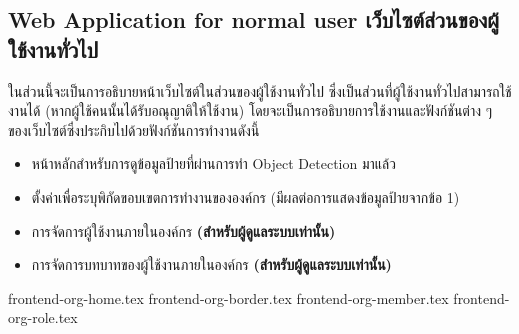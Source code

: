 \clearpage
\subsection{\ifenglish Web Application for normal user \else เว็บไซต์ส่วนของผู้ใช้งานทั่วไป \fi}
\ifenglish \else
ในส่วนนี้จะเป็นการอธิบายหน้าเว็บไซต์ในส่วนของผู้ใช้งานทั่วไป ซึ่งเป็นส่วนที่ผู้ใช้งานทั่วไปสามารถใช้งานได้ (หากผู้ใช้คนนั้นได้รับอณุญาติให้ใช้งาน) โดยจะเป็นการอธิบายการใช้งานและฟังก์ชันต่าง ๆ ของเว็บไซต์ซึ่งประกิบไปด้วยฟังก์ชันการทำงานดังนี้
\begin{itemize}
    \item หน้าหลักสำหรับการดูข้อมูลป้ายที่ผ่านการทำ Object Detection มาแล้ว
    \item ตั้งค่าเพื่อระบุพิกัดขอบเขตการทำงานขององค์กร (มีผลต่อการแสดงข้อมูลป้ายจากข้อ 1)
    \item การจัดการผู้ใช้งานภายในองค์กร \textbf{(สำหรับผู้ดูแลระบบเท่านั้น)}
    \item การจัดการบทบาทของผู้ใช้งานภายในองค์กร \textbf{(สำหรับผู้ดูแลระบบเท่านั้น)}
\end{itemize}
\fi

{frontend-org-home.tex}
\clearpage
{frontend-org-border.tex}
\clearpage
{frontend-org-member.tex}
\clearpage
{frontend-org-role.tex}
